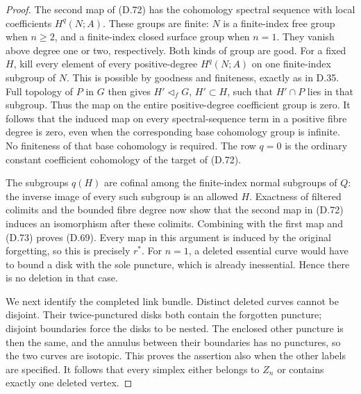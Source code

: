 \begin{proof}
The second map of (D.72) has the cohomology spectral sequence
with local coefficients $H^q(N;A)$.  These groups are finite:
$N$ is a finite-index free group when $n\geq2$, and a
finite-index closed surface group when $n=1$.  They vanish above
degree one or two, respectively.  Both kinds of group are good.
For a fixed $H$, kill every element of every positive-degree
$H^q(N;A)$ on one finite-index subgroup of $N$.  This is possible
by goodness and finiteness, exactly as in D.35.  Full topology
of $P$ in $G$ then gives $H'\triangleleft_f G$, $H'\subset H$,
such that $H'\cap P$ lies in that subgroup.  Thus the map on
the entire positive-degree coefficient group is zero.  It
follows that the induced map on every spectral-sequence term
in a positive fibre degree is zero, even when the corresponding
base cohomology group is infinite.  No finiteness of that base
cohomology is required.  The row $q=0$ is the ordinary constant
coefficient cohomology of the target of (D.72).

The subgroups $q(H)$ are cofinal among the finite-index normal
subgroups of $Q$: the inverse image of every such subgroup is
an allowed $H$.  Exactness of filtered colimits and the bounded
fibre degree now show that the second map in (D.72) induces an
isomorphism after these colimits.  Combining with the first map
and (D.73) proves (D.69).  Every map in this argument is induced
by the original forgetting, so this is precisely $r^*$.
For $n=1$, a deleted essential curve would have to bound a disk
with the sole puncture, which is already inessential.  Hence
there is no deletion in that case.

We next identify the completed link bundle.  Distinct deleted
curves cannot be disjoint.  Their twice-punctured disks both
contain the forgotten puncture; disjoint boundaries force the
disks to be nested.  The enclosed other puncture is then the
same, and the annulus between their boundaries has no punctures,
so the two curves are isotopic.  This proves the assertion also
when the other labels are specified.  It follows that every
simplex either belongs to $Z_n$ or contains exactly one deleted
vertex.


\end{proof}
